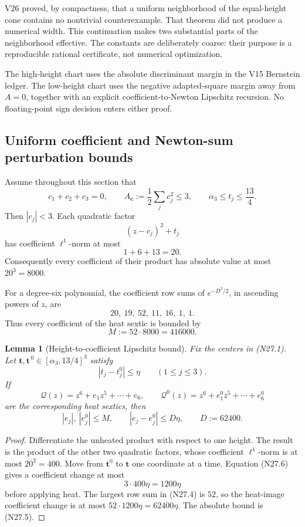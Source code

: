 \documentclass[11pt]{article}
\newtheorem{lemma}[theorem]{Lemma}
\theoremstyle{definition}
\theoremstyle{remark}
\begin{document}
V26 proved, by compactness, that a uniform neighborhood of the
equal-height cone contains no nontrivial counterexample.  That theorem did
not produce a numerical width.  This continuation makes two substantial
parts of the neighborhood effective.  The constants are deliberately
coarse: their purpose is a reproducible rational certificate, not numerical
optimization.

The high-height chart uses the absolute discriminant margin in the V15
Bernstein ledger.  The low-height chart uses the negative adapted-square
margin away from \(A=0\), together with an explicit coefficient-to-Newton
Lipschitz recursion.  No floating-point sign decision enters either proof.

\subsection{Uniform coefficient and Newton-sum perturbation bounds}
\label{subsec:f2v27-lipschitz}

Assume throughout this section that
\[
 c_1+c_2+c_3=0,\qquad
 A_{\bm c}:=\frac12\sum_jc_j^2\leq3,\qquad
 \alpha_3\leq t_j\leq\frac{13}{4}.
 \tag{N27.1}
\]
Then \(|c_j|<3\).  Each quadratic factor
\[
 (z-c_j)^2+t_j
 \tag{N27.2}
\]
has coefficient \(\ell^1\)-norm at most
\[
 1+6+13=20.
 \tag{N27.3}
\]
Consequently every coefficient of their product has absolute value at
most \(20^3=8000\).

For a degree-six polynomial, the coefficient row sums of
\(e^{-D^2/2}\), in ascending powers of \(z\), are
\[
 20,\ 19,\ 52,\ 11,\ 16,\ 1,\ 1.
 \tag{N27.4}
\]
Thus every coefficient of the heat sextic is bounded by
\[
 M:=52\cdot8000=416000.
 \tag{N27.5}
\]

\begin{lemma}[Height-to-coefficient Lipschitz bound]
\label{lem:f2v27-coefficient-bound}
Fix the centers in \textup{(N27.1)}.  Let
\(\bm t,\bm t^{\,0}\in[\alpha_3,13/4]^3\) satisfy
\[
 |t_j-t_j^0|\leq\eta\qquad(1\leq j\leq3).
 \tag{N27.6}
\]
If
\[
 \mathcal Q(z)=z^6+e_1z^5+\cdots+e_6,\qquad
 \mathcal Q^0(z)=z^6+e_1^0z^5+\cdots+e_6^0
 \tag{N27.7}
\]
are the corresponding heat sextics, then
\[
 |e_j|,\ |e_j^0|\leq M,\qquad
 |e_j-e_j^0|\leq D\eta,\qquad
 D:=62400.
 \tag{N27.8}
\]
\end{lemma}

\begin{proof}
Differentiate the unheated product with respect to one height.  The
result is the product of the other two quadratic factors, whose
coefficient \(\ell^1\)-norm is at most \(20^2=400\).  Move from
\(\bm t^0\) to \(\bm t\) one coordinate at a time.  Equation
\textup{(N27.6)} gives a coefficient change at most
\[
 3\cdot400\eta=1200\eta
 \tag{N27.9}
\]
before applying heat.  The largest row sum in \textup{(N27.4)} is \(52\),
so the heat-image coefficient change is at most
\(52\cdot1200\eta=62400\eta\).  The absolute bound is
\textup{(N27.5)}.
\end{proof}
\end{document}
